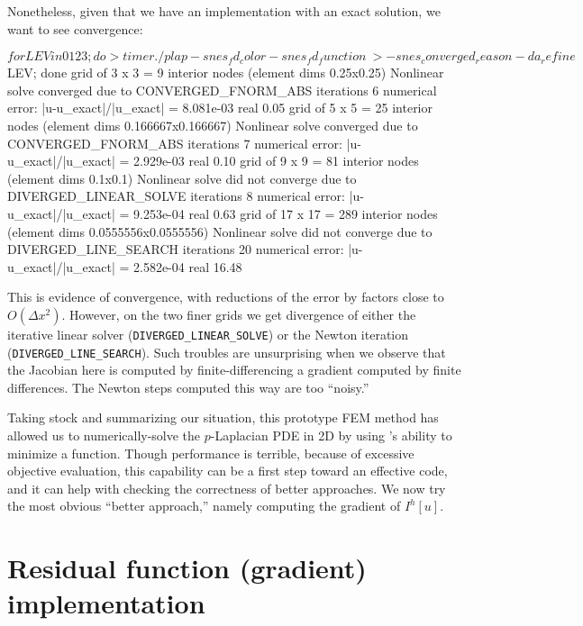 Nonetheless, given that we have an implementation with an exact solution, we want to see convergence:
\begin{cline}
$ for LEV in 0 1 2 3; do
> timer ./plap -snes_fd_color -snes_fd_function \
>   -snes_converged_reason -da_refine $LEV; done
grid of 3 x 3 = 9 interior nodes (element dims 0.25x0.25)
Nonlinear solve converged due to CONVERGED_FNORM_ABS iterations 6
numerical error:  |u-u_exact|/|u_exact| = 8.081e-03
real 0.05
grid of 5 x 5 = 25 interior nodes (element dims 0.166667x0.166667)
Nonlinear solve converged due to CONVERGED_FNORM_ABS iterations 7
numerical error:  |u-u_exact|/|u_exact| = 2.929e-03
real 0.10
grid of 9 x 9 = 81 interior nodes (element dims 0.1x0.1)
Nonlinear solve did not converge due to DIVERGED_LINEAR_SOLVE iterations 8
numerical error:  |u-u_exact|/|u_exact| = 9.253e-04
real 0.63
grid of 17 x 17 = 289 interior nodes (element dims 0.0555556x0.0555556)
Nonlinear solve did not converge due to DIVERGED_LINE_SEARCH iterations 20
numerical error:  |u-u_exact|/|u_exact| = 2.582e-04
real 16.48
\end{cline}
This is evidence of convergence, with reductions of the error by factors close to $O(\Delta x^2)$.  However, on the two finer grids we get divergence of either the iterative linear solver (\texttt{DIVERGED\_LINEAR\_SOLVE}) or the Newton iteration (\texttt{DIVERGED\_LINE\_SEARCH}).  Such troubles are unsurprising when we observe that the Jacobian here is computed by finite-differencing a gradient computed by finite differences.  The Newton steps computed this way are too ``noisy.''

Taking stock and summarizing our situation, this prototype FEM method has allowed us to numerically-solve the $p$-Laplacian PDE in 2D by using \PETSc's ability to minimize a function.  Though performance is terrible, because of excessive objective evaluation, this capability can be a first step toward an effective code, and it can help with checking the correctness of better approaches.  We now try the most obvious ``better approach,'' namely computing the gradient of $I^h[u]$.


\section{Residual function (gradient) implementation}

